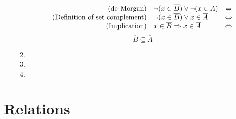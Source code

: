 \documentclass{article}
\begin{document}
\begin{enumerate}
\begin{enumerate}
$$\begin{array}{r l l}
                    \text{(de Morgan)} &\lnot(x \in \overline{B}) \lor \lnot(x \in A) & \Leftrightarrow \\
                    \text{(Definition of set complement)} &\lnot(x \in \overline{B}) \lor x \in \overline{A} & \Leftrightarrow \\
                    \text{(Implication)} & x \in \overline{B} \Rightarrow x \in \overline{A} & \Leftrightarrow \\
                \end{array}$$
                $$\overline{B} \subseteq \overline{A}$$
            \item
            \item
            \item
        \end{enumerate}
\end{enumerate}

\section{Relations}
\end{document}
